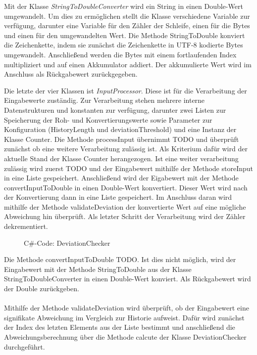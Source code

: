     
    Mit der Klasse \textit{StringToDoubleConverter} wird ein String in einen Double-Wert umgewandelt.
    Um dies zu ermöglichen stellt die Klasse verschiedene Variable zur verfügung, darunter eine Variable für den Zähler der Schleife, einen für die Bytes und einen für den umgewandelten Wert.
    Die Methode StringToDouble konviert die Zeichenkette, indem sie zunächst die Zeichenkette in UTF-8 kodierte Bytes umgewandelt.
    Anschließend werden die Bytes mit einem fortlaufenden Index multipliziert und auf einen Akkumulator addiert.
    Der akkumulierte Wert wird im Anschluss als Rückgabewert zurückgegeben.
    
    Die letzte der vier Klassen ist \textit{InputProcessor}.
    Diese ist für die Verarbeitung der Eingabewerte zuständig.
    Zur Verarbeitung stehen mehrere interne Datenstrukturen und konstanten zur verfügung, darunter zwei Listen zur Speicherung der Roh- und Konvertierungswerte sowie Parameter zur Konfiguration (HistoryLength und deviationThreshold) und eine Instanz der Klasse Counter.
    Die Methode processInput übernimmt TODO und überprüft zunächst ob eine weitere Verarbeitung zulässig ist. 
    Als Kriterium dafür wird der aktuelle Stand der Klasse Counter herangezogen.
    Ist eine weiter verarbeitung zulässig wird zuerst TODO und der Eingabewert mithilfe der Methode storeInput in eine Liste gespeichert.
    Anschließend wird der Eigabewert mit der Methode convertInputToDouble in einen Double-Wert konvertiert.
    Dieser Wert wird nach der Konvertierung dann in eine Liste gespeichert.
    Im Anschluss daran wird mithilfe der Methode validateDeviation der konvertierte Wert auf eine mögliche Abweichung hin überprüft.
    Als letzter Schritt der Verarbeitung wird der Zähler dekrementiert.
    \newpage
    \begin{figure}[H]
        \centering
                
        \caption{C\#-Code: DeviationChecker}
    \end{figure}
    \noindent
    Die Methode convertInputToDouble TODO. Ist dies nicht möglich, wird der Eingabewert mit der Methode StringToDouble aus der Klasse StringToDoubleConverter in einen Double-Wert konviert.
    Als Rückgabewert wird der Double zurückgeben.\\
    \\
    Mithilfe der Methode validateDeviation wird überprüft, ob der Eingabewert eine signifikate Abweichung im Vergleich zur Historie aufweist.
    Dafür wird zunächst der Index des letzten Elements aus der Liste bestimmt und anschließend die Abweichungsberechnung über die Methode calcute der Klasse DeviationChecker durchgeführt.
